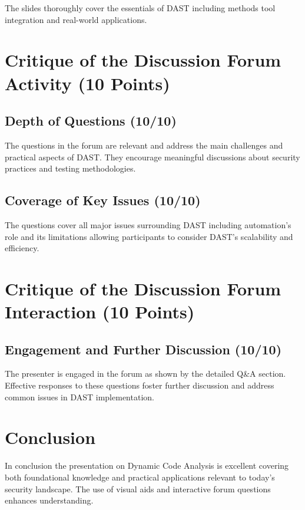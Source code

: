 \documentclass{article}
\begin{document}
The slides thoroughly cover the essentials of DAST including methods tool integration and real-world applications.

\section*{Critique of the Discussion Forum Activity (10 Points)}

\subsection*{Depth of Questions (10/10)}

The questions in the forum are relevant and address the main challenges and practical aspects of DAST. They encourage meaningful discussions about security practices and testing methodologies.

\subsection*{Coverage of Key Issues (10/10)}

The questions cover all major issues surrounding DAST including automation's role and its limitations allowing participants to consider DAST's scalability and efficiency.

\section*{Critique of the Discussion Forum Interaction (10 Points)}

\subsection*{Engagement and Further Discussion (10/10)}

The presenter is engaged in the forum as shown by the detailed Q\&A section. Effective responses to these questions foster further discussion and address common issues in DAST implementation.

\section*{Conclusion}

In conclusion the presentation on Dynamic Code Analysis is excellent covering both foundational knowledge and practical applications relevant to today's security landscape. The use of visual aids and interactive forum questions enhances understanding.
\end{document}
